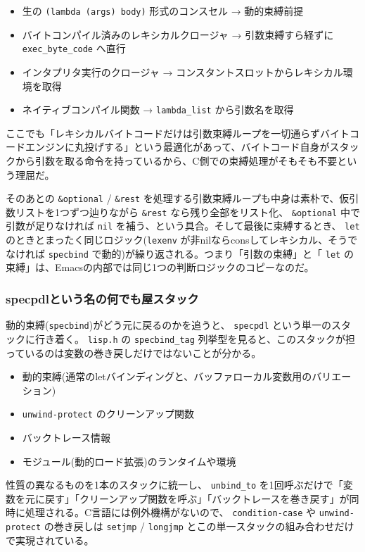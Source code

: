 \documentclass[11pt]{article}
\begin{document}
\begin{itemize}
\item 生の \texttt{(lambda (args) body)} 形式のコンスセル → 動的束縛前提
\item バイトコンパイル済みのレキシカルクロージャ → 引数束縛すら経ずに \texttt{exec\_byte\_code} へ直行
\item インタプリタ実行のクロージャ → コンスタントスロットからレキシカル環境を取得
\item ネイティブコンパイル関数 → \texttt{lambda\_list} から引数名を取得
\end{itemize}

ここでも「レキシカルバイトコードだけは引数束縛ループを一切通らずバイトコードエンジンに丸投げする」という最適化があって、バイトコード自身がスタックから引数を取る命令を持っているから、C側での束縛処理がそもそも不要という理屈だ。

そのあとの \texttt{\&optional} / \texttt{\&rest} を処理する引数束縛ループも中身は素朴で、仮引数リストを1つずつ辿りながら \texttt{\&rest} なら残り全部をリスト化、 \texttt{\&optional} 中で引数が足りなければ \texttt{nil} を補う、という具合。そして最後に束縛するとき、 \texttt{let} のときとまったく同じロジック(\texttt{lexenv} が非nilならconsしてレキシカル、そうでなければ \texttt{specbind} で動的)が繰り返される。つまり「引数の束縛」と「 \texttt{let} の束縛」は、Emacsの内部では同じ1つの判断ロジックのコピーなのだ。
\subsubsection{specpdlという名の何でも屋スタック}
\label{sec:orgb13633f}

動的束縛(\texttt{specbind})がどう元に戻るのかを追うと、 \texttt{specpdl} という単一のスタックに行き着く。 \texttt{lisp.h} の \texttt{specbind\_tag} 列挙型を見ると、このスタックが担っているのは変数の巻き戻しだけではないことが分かる。

\begin{itemize}
\item 動的束縛(通常のletバインディングと、バッファローカル変数用のバリエーション)
\item \texttt{unwind-protect} のクリーンアップ関数
\item バックトレース情報
\item モジュール(動的ロード拡張)のランタイムや環境
\end{itemize}

性質の異なるものを1本のスタックに統一し、 \texttt{unbind\_to} を1回呼ぶだけで「変数を元に戻す」「クリーンアップ関数を呼ぶ」「バックトレースを巻き戻す」が同時に処理される。C言語には例外機構がないので、 \texttt{condition-case} や \texttt{unwind-protect} の巻き戻しは \texttt{setjmp} / \texttt{longjmp} とこの単一スタックの組み合わせだけで実現されている。
\end{document}
